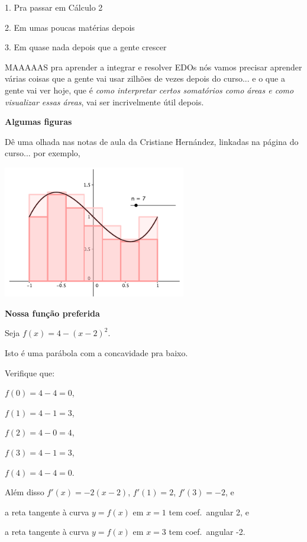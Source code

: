 \documentclass[oneside,12pt]{article}
\begin{document}
1. Pra passar em Cálculo 2

2. Em umas poucas matérias depois

3. Em quase nada depois que a gente crescer

\msk

MAAAAAS pra aprender a integrar e resolver EDOs nós vamos precisar
aprender várias coisas que a gente vai usar zilhões de vezes depois do
curso... e o que a gente vai ver hoje, que é {\sl como interpretar
  certos somatórios como áreas e como visualizar essas áreas}, vai ser
incrivelmente útil depois.



\newpage

{\bf Algumas figuras}

Dê uma olhada nas notas de aula da Cristiane Hernández, linkadas na
página do curso... por exemplo,


\includegraphics[width=8cm]{2020-1-C2/area-hernandez-1.png}


\newpage

{\bf Nossa função preferida}

Seja $f(x) = 4 - (x-2)^2$.

Isto é uma parábola com a concavidade pra baixo.

Verifique que:

$f(0)=4-4=0$,

$f(1)=4-1=3$,

$f(2)=4-0=4$,

$f(3)=4-1=3$,

$f(4)=4-4=0$.

\msk

Além disso $f'(x) = -2(x-2)$, $f'(1)=2$, $f'(3)=-2$, e

a reta tangente à curva $y=f(x)$ em $x=1$ tem coef.\ angular 2, e

a reta tangente à curva $y=f(x)$ em $x=3$ tem coef.\ angular -2.
\end{document}
